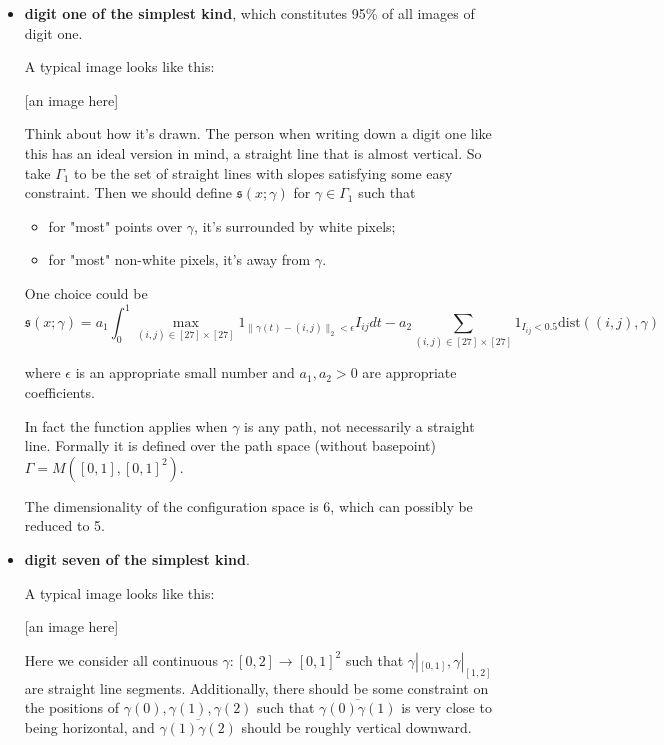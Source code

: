 \documentclass[11pt, oneside]{article}   	%
\theoremstyle{definition}
\begin{document}
\begin{itemize}
	\item \textbf{digit one of the simplest kind}, which constitutes 95\% of all images of digit one.

A typical image looks like this:

[an image here]

Think about how it's drawn. The person when writing down a digit one like this has an ideal version in mind, a straight line that is almost vertical. So take $\Gamma_1$ to be the set of straight lines with slopes satisfying some easy constraint. Then we should define $\mathfrak{s}(x;\gamma)$ for $\gamma\in \Gamma_1$ such that
\begin{itemize}
	\item for "most" points over $\gamma$, it's surrounded by white pixels;
	\item for "most" non-white pixels, it's away from $\gamma$.
\end{itemize}

One choice could be
\begin{equation}
	\mathfrak{s}(x; \gamma)=a_1\int_{0}^1  \max_{(i,j)\in [27]\times[27]}1_{\|\gamma(t) - (i,j)\|_2 < \epsilon} I_{ij}dt
	-
	a_2\sum_{(i,j)\in [27]\times[27]} 1_{I_{ij}< 0.5}\text{dist}((i,j), \gamma)
\end{equation}

where $\epsilon$ is an appropriate small number and $a_1,a_2>0$ are appropriate coefficients.

In fact the function applies when $\gamma$ is any path, not necessarily a straight line. Formally it is defined over the path space (without basepoint) $\Gamma= M([0,1], [0,1]^2)$.

The dimensionality of the configuration space is 6, which can possibly be reduced to 5.

\item \textbf{digit seven of the simplest kind}.

A typical image looks like this:

[an image here]

Here we consider all continuous $\gamma:[0,2]\to [0,1]^2$ such that $\gamma|_{[0,1]}, \gamma|_{[1,2]}$ are straight line segments. Additionally, there should be some constraint on the positions of $\gamma(0), \gamma(1), \gamma(2)$ such that $\overline{\gamma(0)\gamma(1)}$ is very close to being horizontal, and $\overline{\gamma(1)\gamma(2)}$ should be roughly vertical downward.


\end{itemize}
\end{document}
